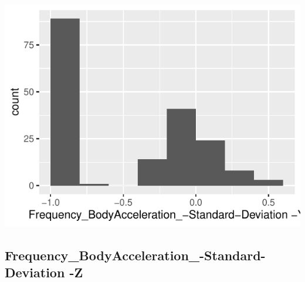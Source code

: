 \documentclass[
]{article}
\begin{document}
\begin{minipage}{0.25 \textwidth}

\includegraphics{codebook_tidydatasub_files/figure-latex/Var-47-Frequency-BodyAcceleration--Standard-Deviation--Y-1.pdf}

\end{minipage}

\noindent\makebox[\linewidth]{\rule{\textwidth}{0.4pt}}

\hypertarget{frequency_bodyacceleration_-standard-deviation--z}{%
\subsection{Frequency\_BodyAcceleration\_-Standard-Deviation
-Z}\label{frequency_bodyacceleration_-standard-deviation--z}}
\end{document}
